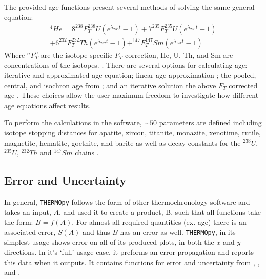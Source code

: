 \documentclass[12pt]{article}
\begin{document}
The provided age functions present several methods of solving the same general equation: 
\begin{multline}
     ^4He = 8^{238}F_T^{238}U(e^{\lambda_{238}t} - 1) + 7^{235}F_T^{235}U(e^{\lambda_{235}t} - 1) \\  + 6^{232}F_T^{232}Th(e^{\lambda_{232}t} - 1) + ^{147}F_T^{147}Sm(e^{\lambda_{147}t} - 1) 
\end{multline}
Where $^{n}F_T^{n}$ are the isotope-specific $F_T$ correction, He, U, Th, and Sm are concentrations of the isotopes.  \citep{ketchametal2011}. There are several options for calculating age: \cite{meestersanddunai2002a} iterative and approximated age equation; linear age approximation \citep{vermeesch2008}; the pooled, central, and isochron age from \cite{vermeesch2008}; and an iterative solution the above $F_T$ corrected age \citep{ketchametal2011}. These choices allow the user maximum freedom to investigate how different age equations affect results. 

To perform the calculations in the software, $\sim 50$ parameters are defined including isotope stopping distances for apatite, zircon, titanite, monazite, xenotime, rutile, magnetite, hematite, goethite, and barite as well as decay constants for the $^{238}U$, $^{235}U$, $^{232}Th$ and $^{147}Sm$ chains \citep{ziegleretal2010, ketchametal2011}. 

\subsection{Error and Uncertainty}
In general, \texttt{THERMOpy} follows the form of other thermochronology software and takes an input, $A$, and used it to create a product, B, such that all functions take the form: $B = f(A)$. For almost all required quantities (ex. age) there is an associated error, $S(A)$ and thus $B$ has an error as well. \texttt{THERMOpy}, in its simplest usage shows error on all of its produced plots, in both the $x$ and $y$ directions. In it's `full' usage case, it preforms an error propagation and reports this data when it outputs. It contains functions for error and uncertainty from \cite{vermeesch2008}, \cite{reinersetal2018}, and \cite{martinetal2023}. 
\end{document}

